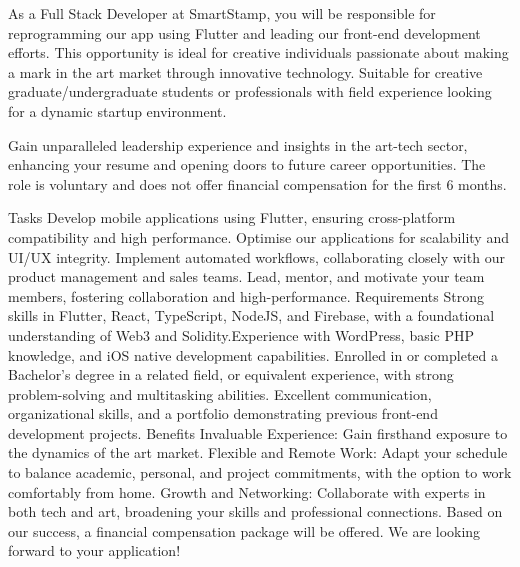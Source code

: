 As a Full Stack Developer at SmartStamp, you will be responsible for reprogramming our app using Flutter and leading our front-end development efforts. This opportunity is ideal for creative individuals passionate about making a mark in the art market through innovative technology. Suitable for creative graduate/undergraduate students or professionals with field experience looking for a dynamic startup environment.

Gain unparalleled leadership experience and insights in the art-tech sector, enhancing your resume and opening doors to future career opportunities. The role is voluntary and does not offer financial compensation for the first 6 months.

Tasks
Develop mobile applications using Flutter, ensuring cross-platform compatibility and high performance.
Optimise our applications for scalability and UI/UX integrity.
Implement automated workflows, collaborating closely with our product management and sales teams.
Lead, mentor, and motivate your team members, fostering collaboration and high-performance.
Requirements
Strong skills in Flutter, React, TypeScript, NodeJS, and Firebase, with a foundational understanding of Web3 and Solidity.Experience with WordPress, basic PHP knowledge, and iOS native development capabilities.
Enrolled in or completed a Bachelor’s degree in a related field, or equivalent experience, with strong problem-solving and multitasking abilities.
Excellent communication, organizational skills, and a portfolio demonstrating previous front-end development projects.
Benefits
Invaluable Experience: Gain firsthand exposure to the dynamics of the art market.
Flexible and Remote Work: Adapt your schedule to balance academic, personal, and project commitments, with the option to work comfortably from home.
Growth and Networking: Collaborate with experts in both tech and art, broadening your skills and professional connections.
Based on our success, a financial compensation package will be offered.
We are looking forward to your application!